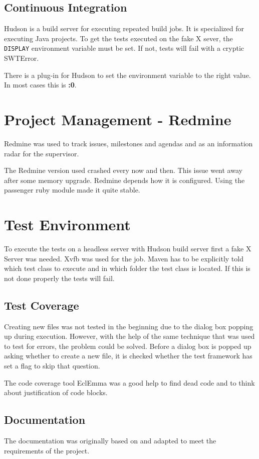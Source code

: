 \subsection{Continuous Integration}

Hudson is a build server for executing repeated build jobs. It is specialized
for executing Java projects. To get the tests executed on the fake X sever, the
\texttt{DISPLAY} environment variable must be set. If not, tests will fail with
a cryptic SWTError.

There is a plug-in for Hudson\cite{hudson} to set the environment variable to
the right value. In most cases this is \textbf{:0}.

\section{Project Management - Redmine}

Redmine\cite{redmine} was used to track issues, milestones and agendas and as an information 
radar for the supervisor.

The Redmine version used crashed every now and then. This issue went away after
some memory upgrade. Redmine depends how it is configured. Using the passenger
ruby module made it quite stable. 

\section{Test Environment}

To execute the tests on a headless server with Hudson build server first a fake
X Server was needed. Xvfb\cite{xvfb} was used for the job. Maven has to be
explicitly told which test class to execute and in which folder the test class
is located. If this is not done properly the tests will fail.

\subsection{Test Coverage}

Creating new files was not tested in the beginning due to the dialog box popping 
up during execution. However, with the help of the same technique that was used 
to test for errors, the problem could be solved. Before a dialog box is popped 
up asking whether to create a new file, it is checked whether the test framework 
has set a flag to skip that question.

The code coverage tool EclEmma\cite{eclEmma} was a good help to find dead code 
and to think about justification of code blocks.

\subsection{Documentation}

The documentation was originally based on \cite{AV08} and adapted to meet the 
requirements of the project.

